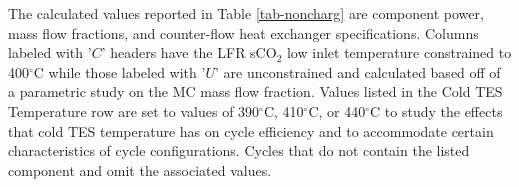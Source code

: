 \begin{paracol}{2}
The calculated values reported in Table \ref{tab-noncharg} are component power, mass flow fractions, and counter-flow heat exchanger specifications. Columns labeled with '$C$' headers have the LFR sCO$_2$ low inlet temperature constrained to 400$^{\circ}$C while those labeled with '$U$' are unconstrained and calculated based off of a parametric study on the MC mass flow fraction. Values listed in the Cold TES Temperature row are set to values of 390$^{\circ}$C, 410$^{\circ}$C, or 440$^{\circ}$C to study the effects that cold TES temperature has on cycle efficiency and to accommodate certain characteristics of cycle configurations. Cycles that do not contain the listed component and omit the associated values. 
\clearpage 
{}
\end{paracol}
